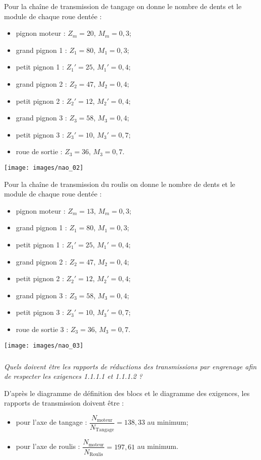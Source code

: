 \documentclass[10pt,fleqn]{article} %
\begin{document}
\begin{multicols}{2}
Pour la chaîne de transmission de tangage on donne  le nombre de dents et le module de chaque roue dentée : 
\begin{itemize}
\item pignon moteur : $Z_m=20$, $M_m=0,3$;
\item grand pignon 1 : $Z_1 = 80$, $M_1=0,3$;
\item petit pignon 1 : $Z_1' = 25$, $M_1'=0,4$;
\item grand pignon 2 : $Z_2 = 47$, $M_2=0,4$;
\item petit pignon 2 : $Z_2' = 12$, $M_2'=0,4$;
\item grand pignon 3 : $Z_3 = 58$, $M_3=0,4$;
\item petit pignon 3 : $Z_3' = 10$, $M_3'=0,7$;
\item roue de sortie : $Z_3 = 36$, $M_3=0,7$.
\end{itemize}

\begin{center}
\texttt{[image: images/nao\_02]}
\end{center}

Pour la chaîne de transmission du roulis on donne le nombre de dents et le module de chaque roue dentée : 
\begin{itemize}
\item pignon moteur : $Z_m=13$, $M_m=0,3$;
\item grand pignon 1 : $Z_1 = 80$, $M_1=0,3$;
\item petit pignon 1 : $Z_1' = 25$, $M_1'=0,4$;
\item grand pignon 2 : $Z_2 = 47$, $M_2=0,4$;
\item petit pignon 2 : $Z_2' = 12$, $M_2'=0,4$;
\item grand pignon 3 : $Z_3 = 58$, $M_3=0,4$;
\item petit pignon 3 : $Z_3' = 10$, $M_3'=0,7$;
\item roue de sortie 3 : $Z_3 = 36$, $M_3=0,7$.
\end{itemize}



\begin{center}
\texttt{[image: images/nao\_03]}
\end{center}




\subparagraph{}
\textit{Quels doivent être les rapports de réductions des transmissions par engrenage afin de respecter les exigences 1.1.1.1 et 1.1.1.2 ?}
\ifprof
\begin{corrige}
D'après le diagramme de définition des blocs et le diagramme des exigences, les rapports de transmission doivent être : 
\begin{itemize}
\item pour l'axe de tangage : $\dfrac{N_{\text{moteur}}}{N_{\text{Tangage}}}=138,33$ au minimum; 
\item pour l'axe de roulis :  $\dfrac{N_{\text{moteur}}}{N_{\text{Roulis}}}= 197,61$ au minimum.
\end{itemize}
\end{corrige}
\else
\fi



\end{multicols}
\end{document}

